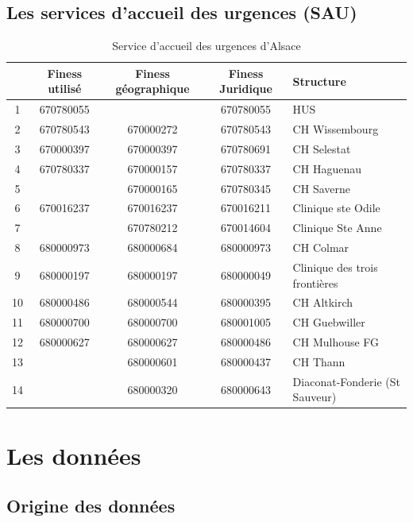 \documentclass[12pt,english,french]{report}
\begin{document}
\section{Les services d'accueil des urgences (SAU)}

\begin{table}
\begin{center}
\begin{tabular}{|c|c|c|c|l|}
  \hline
& Finess utilisé & Finess géographique & Finess Juridique & Structure \\
  \hline
  \hline
1 & 670780055 &   & 670780055 & HUS \\
2 & 670780543 & 670000272 & 670780543 & CH Wissembourg \\
3 & 670000397 & 670000397  & 670780691 & CH Selestat \\
4 & 670780337 & 670000157 & 670780337 & CH Haguenau \\
5 &   & 670000165 & 670780345 & CH Saverne \\
6 & 670016237  & 670016237  & 670016211 & Clinique ste Odile \\
7 &   & 670780212 & 670014604 & Clinique Ste Anne \\
8 & 680000973 & 680000684 & 680000973 & CH Colmar \\
9 & 680000197  & 680000197  & 680000049 & Clinique des trois frontières \\
10 & 680000486 & 680000544  & 680000395 & CH Altkirch \\
11 & 680000700 & 680000700 & 680001005 & CH Guebwiller \\
12 & 680000627 & 680000627 & 680000486 & CH Mulhouse FG \\
13 &   & 680000601 & 680000437 & CH Thann \\
14 &   & 680000320  & 680000643 & Diaconat-Fonderie (St Sauveur) \\
\hline
\end{tabular}
\caption{Service d'accueil des urgences d'Alsace}
\label{summary}
\end{center}
\end{table}

%
%
\chapter{Les données}

\section{Origine des données}
\end{document}

